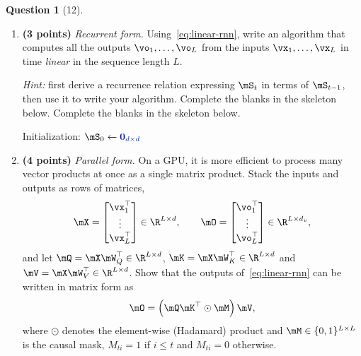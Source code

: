 \documentclass[12pt]{article}
\theoremstyle{definition}
\newtheorem{exercise}{Question}%
\begin{document}
\begin{exercise}[12]
\begin{enumerate}[label=\textbf{\arabic*.}, leftmargin=*]
\item \textbf{(3 points)} \emph{Recurrent form.} Using~\eqref{eq:linear-rnn}, write an
algorithm that computes all the outputs $\vo_1, \dots, \vo_L$ from the inputs
$\vx_1, \dots, \vx_L$ in time \emph{linear} in the sequence length $L$.

\emph{Hint:} first derive a recurrence relation expressing $\mS_t$ in terms of $\mS_{t-1}$,
then use it to write your algorithm.
Complete the blanks in the skeleton below.
Complete the blanks in the skeleton below.

\begin{minipage}{\linewidth}
    \begin{algorithm}[H]
    \DontPrintSemicolon
    Initialization: $\mS_{0} \leftarrow \textcolor{answer}{\mathbf{0}_{d\times d}}$\;
    \textcolor{answer}{}\;
    \caption{Linear attention, recurrent form}
    \label{alg:linear-rnn}
    \end{algorithm}
\end{minipage}

\item \textbf{(4 points)} \emph{Parallel form.} On a GPU, it is more efficient to process
many vector products at once as a single matrix product. Stack the inputs and outputs as
rows of matrices,
\[
    \mX = \begin{bmatrix} \vx_1^\top \\ \vdots \\ \vx_L^\top \end{bmatrix} \in \R^{L \times d},
    \qquad
    \mO = \begin{bmatrix} \vo_1^\top \\ \vdots \\ \vo_L^\top \end{bmatrix} \in \R^{L \times d_v},
\]
and let $\mQ = \mX \mW_Q^\top \in \R^{L \times d}$, $\mK = \mX \mW_K^\top \in \R^{L \times d}$
and $\mV = \mX \mW_V^\top \in \R^{L \times d}$. Show that the outputs of~\eqref{eq:linear-rnn}
can be written in matrix form as
\begin{equation}
    \mO = \left( \mQ \mK^\top \odot \mM \right) \mV,
    \label{eq:parallel}
\end{equation}
where $\odot$ denotes the element-wise (Hadamard) product and $\mM \in \{0,1\}^{L \times L}$
is the causal mask, $M_{ti} = 1$ if $i \le t$ and $M_{ti} = 0$ otherwise.


\end{enumerate}
\end{exercise}
\end{document}
